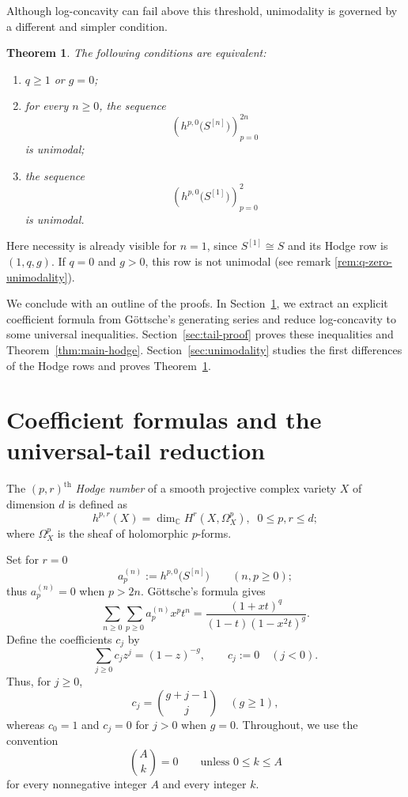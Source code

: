 \documentclass[12pt]{amsart}
\theoremstyle{plain}
\newtheorem{theorem}{Theorem}[section]
\theoremstyle{definition}
\theoremstyle{remark}
\begin{document}
Although log-concavity can fail above this threshold, unimodality is
governed by a different and simpler condition.

\begin{theorem}\label{thm:unimodality-intro}
The following conditions are equivalent:
\begin{enumerate}[label=\textup{(\roman*)}]
\item \(q\ge1\) or \(g=0\);
\item for every \(n\ge0\), the sequence
      \[
       \left(h^{p,0}\bigl(S^{[n]}\bigr)\right)_{p=0}^{2n}
      \]
      is unimodal;
\item the sequence
      \[
       \left(h^{p,0}\bigl(S^{[1]}\bigr)\right)_{p=0}^{2}
      \]
      is unimodal.
\end{enumerate}
\end{theorem}

Here necessity is already visible for \(n=1\), since
\(S^{[1]}\cong S\) and its Hodge row is \((1,q,g)\).  If \(q=0\) and
\(g>0\), this row is not unimodal (see remark \ref{rem:q-zero-unimodality}).




We conclude with an outline of the proofs.  In
Section~\ref{sec:coefficients}, we extract an explicit coefficient
formula from G\"ottsche's generating series and reduce log-concavity to some universal inequalities.  Section~\ref{sec:tail-proof} proves
these inequalities and Theorem~\ref{thm:main-hodge}.
Section~\ref{sec:unimodality} studies the first differences of the
Hodge rows and proves Theorem~\ref{thm:unimodality-intro}. 


\section{Coefficient formulas and the universal-tail reduction}
\label{sec:coefficients}
The $(p,r)^{\text{th}}$ \emph{Hodge number} of a smooth projective complex variety $X$ of dimension $d$ is defined as $$h^{p,r}(X)= \dim_{\mathbb{C}}H^r(X, \Omega^p_X),\;\; 0\le p,r \le d;$$ where $\Omega^p_X$ is the sheaf of holomorphic $p$-forms.

Set for $r=0$
\[
 a_p^{(n)}:=h^{p,0}\bigl(S^{[n]}\bigr)
 \qquad(n,p\ge0);
\]
thus \(a_p^{(n)}=0\) when \(p>2n\).
G\"ottsche's formula \cite[Proposition~3.3(a)]{Gottsche} gives
\begin{equation}\label{eq:master-series}
 \sum_{n\ge0}\sum_{p\ge0}a_p^{(n)}x^pt^n
 =\frac{(1+xt)^q}{(1-t)(1-x^2t)^g}.
\end{equation}
Define the coefficients \(c_j\) by
\begin{equation}\label{eq:c-generating}
 \sum_{j\ge0}c_jz^j=(1-z)^{-g},
 \qquad c_j:=0\quad(j<0).
\end{equation}
Thus, for \(j\ge0\),
\[
 c_j=\binom{g+j-1}{j}\quad(g\ge1),
\]
whereas \(c_0=1\) and \(c_j=0\) for \(j>0\) when \(g=0\).
Throughout, we use the convention
\[
 \binom{A}{k}=0\qquad\text{unless }0\le k\le A
\]
for every nonnegative integer \(A\) and every integer \(k\).
\end{document}
